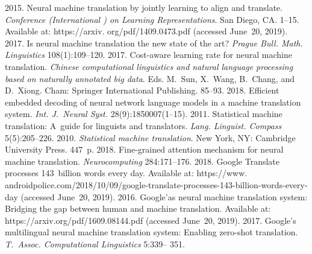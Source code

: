 \begin{multicols}{2}
{\small\frenchspacing
 {%
 \begin{thebibliography}{99}
   2015. Neural machine translation 
by jointly learning to align and translate. \textit{Conference (International ) on 
Learning Representations}. San Diego, CA. 1--15. Available at: {\sf 
https://arxiv. org/pdf/1409.0473.pdf} (accessed June~20, 2019).
2017. Is neural machine translation the new state of the art? \textit{Prague 
Bull. Math. Linguistics} 108(1):109--120.
   2017. Cost-aware learning rate 
for neural machine translation. \textit{Chinese computational linguistics and natural 
language processing based on naturally annotated big data}. Eds. M.~Sun, 
X.~Wang, B.~Chang, and D.~Xiong. Cham: Springer International Publishing.  
85--93.
   2018. Efficient embedded 
decoding of neural network language models in a machine translation system. 
\textit{Int. J.~Neural Syst.} 28(9):1850007(1--15).
   2011. Statistical machine translation: A~guide 
for linguists and translators. \textit{Lang. Linguist. Compass} 5(5):205--226.
   2010. \textit{Statistical machine translation}. New York, NY: 
  Cambridge University Press. 447~p.
   2018. Fine-grained attention mechanism 
for neural machine translation. \textit{Neurocomputing} 284:171--176.
   2018. Google Translate processes 143~billion words every 
day. Available at:  {\sf  
https://www. androidpolice.com/2018/10/09/google-translate-processes-143-billion-words-every-day} (accessed June~20, 2019).
   2016. Google'as neural machine translation system: Bridging the gap 
between human and machine translation. Available at: {\sf 
https://arxiv.org/pdf/1609.08144.pdf} (accessed June~20, 2019).
   2017. Google's multilingual neural machine translation system: 
Enabling zero-shot translation. \textit{T.~Assoc. Computational Linguistics} 5:339--
351.
\end{thebibliography}}}
\end{multicols}
